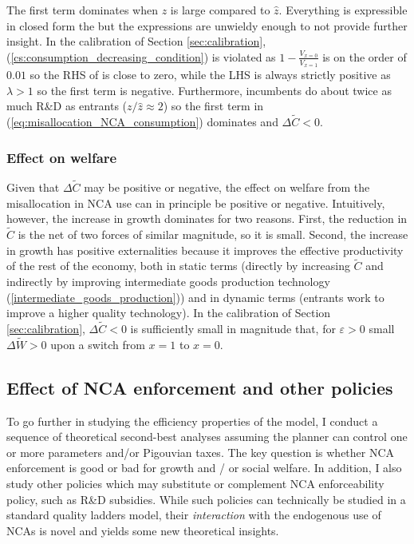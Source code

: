 \documentclass[11pt,english]{article}
\begin{document}
The first term dominates when $z$ is large compared to $\hat{z}$. Everything is expressible in closed form the but the expressions are unwieldy enough to not provide further insight. In the calibration of Section \ref{sec:calibration}, (\ref{cs:consumption_decreasing_condition}) is violated as $1 - \frac{V_{x = 0}}{V_{x = 1}}$ is on the order of $0.01$ so the RHS of is close to zero, while the LHS is always strictly positive as $\lambda > 1$ so the first term is negative. Furthermore, incumbents do about twice as much R\&D as entrants ($z / \hat{z} \approx 2 $) so the first term in (\ref{eq:misallocation_NCA_consumption}) dominates and $\Delta \tilde{C} < 0$.

\subsubsection{Effect on welfare}

Given that $\Delta \tilde{C}$ may be positive or negative, the effect on welfare from the misallocation in NCA use can in principle be positive or negative. Intuitively, however, the increase in growth dominates for two reasons. First, the reduction in $\tilde{C}$ is the net of two forces of similar magnitude, so it is small. Second, the increase in growth has positive externalities because it improves the effective productivity of the rest of the economy, both in static terms (directly by increasing $\tilde{C}$ and indirectly by improving intermediate goods production technology (\ref{intermediate_goods_production})) and in dynamic terms (entrants work to improve a higher quality technology). In the calibration of Section \ref{sec:calibration}, $\Delta \tilde{C} < 0$ is sufficiently small in magnitude that, for $\varepsilon > 0$ small $\Delta \tilde{W} > 0$ upon a switch from $x = 1$ to $x = 0$. 

\subsection{Effect of NCA enforcement and other policies}\label{model:efficiency:policy_analysis}

To go further in studying the efficiency properties of the model, I conduct a sequence of theoretical second-best analyses assuming the planner can control one or more parameters and/or Pigouvian taxes. The key question is whether NCA enforcement is good or bad for growth and / or social welfare. In addition, I also study other policies which may substitute or complement NCA enforceability policy, such as R\&D subsidies. While such policies can technically be studied in a standard quality ladders model, their \textit{interaction} with the endogenous use of NCAs is novel and yields some new theoretical insights.
\end{document}

